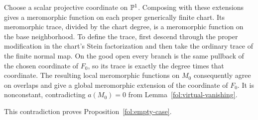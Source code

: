 Choose a scalar projective coordinate on $\mathbb{P}^1$.  Composing with
these extensions gives a meromorphic function on each proper
generically finite chart.  Its meromorphic trace, divided by the
chart degree, is a meromorphic function on the base neighborhood.
To define the trace, first descend through the proper modification
in the chart's Stein factorization and then take the ordinary trace
of the finite normal map.  On the good open every branch is the
same pullback of the chosen coordinate of $F_0$, so its trace is
exactly the degree times that coordinate.  The resulting local
meromorphic functions on $M_0$ consequently agree on overlaps and
give a global meromorphic extension of the coordinate of $F_0$.
It is nonconstant, contradicting $a(M_0)=0$ from
Lemma~\ref{fol:virtual-vanishing}.

This contradiction proves Proposition~\ref{fol:empty-case}.
